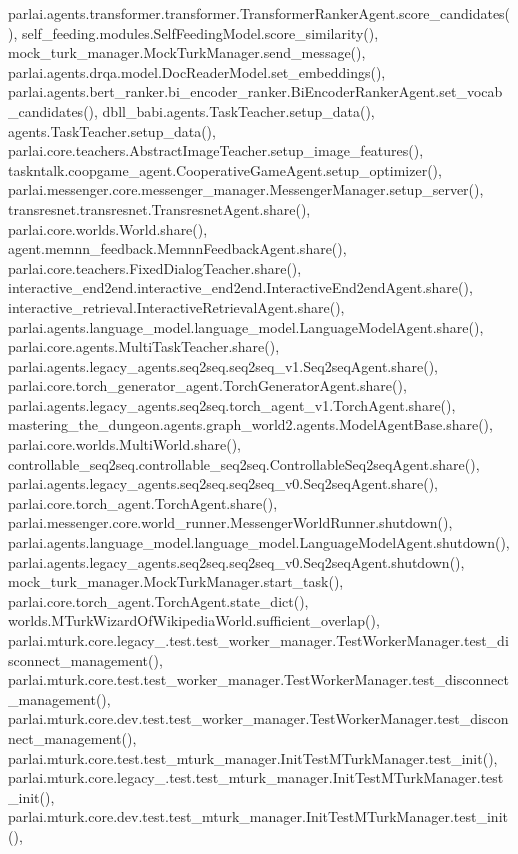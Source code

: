parlai.\+agents.\+transformer.\+transformer.\+Transformer\+Ranker\+Agent.\+score\+\_\+candidates(), self\+\_\+feeding.\+modules.\+Self\+Feeding\+Model.\+score\+\_\+similarity(), mock\+\_\+turk\+\_\+manager.\+Mock\+Turk\+Manager.\+send\+\_\+message(), parlai.\+agents.\+drqa.\+model.\+Doc\+Reader\+Model.\+set\+\_\+embeddings(), parlai.\+agents.\+bert\+\_\+ranker.\+bi\+\_\+encoder\+\_\+ranker.\+Bi\+Encoder\+Ranker\+Agent.\+set\+\_\+vocab\+\_\+candidates(), dbll\+\_\+babi.\+agents.\+Task\+Teacher.\+setup\+\_\+data(), agents.\+Task\+Teacher.\+setup\+\_\+data(), parlai.\+core.\+teachers.\+Abstract\+Image\+Teacher.\+setup\+\_\+image\+\_\+features(), taskntalk.\+coopgame\+\_\+agent.\+Cooperative\+Game\+Agent.\+setup\+\_\+optimizer(), parlai.\+messenger.\+core.\+messenger\+\_\+manager.\+Messenger\+Manager.\+setup\+\_\+server(), transresnet.\+transresnet.\+Transresnet\+Agent.\+share(), parlai.\+core.\+worlds.\+World.\+share(), agent.\+memnn\+\_\+feedback.\+Memnn\+Feedback\+Agent.\+share(), parlai.\+core.\+teachers.\+Fixed\+Dialog\+Teacher.\+share(), interactive\+\_\+end2end.\+interactive\+\_\+end2end.\+Interactive\+End2end\+Agent.\+share(), interactive\+\_\+retrieval.\+Interactive\+Retrieval\+Agent.\+share(), parlai.\+agents.\+language\+\_\+model.\+language\+\_\+model.\+Language\+Model\+Agent.\+share(), parlai.\+core.\+agents.\+Multi\+Task\+Teacher.\+share(), parlai.\+agents.\+legacy\+\_\+agents.\+seq2seq.\+seq2seq\+\_\+v1.\+Seq2seq\+Agent.\+share(), parlai.\+core.\+torch\+\_\+generator\+\_\+agent.\+Torch\+Generator\+Agent.\+share(), parlai.\+agents.\+legacy\+\_\+agents.\+seq2seq.\+torch\+\_\+agent\+\_\+v1.\+Torch\+Agent.\+share(), mastering\+\_\+the\+\_\+dungeon.\+agents.\+graph\+\_\+world2.\+agents.\+Model\+Agent\+Base.\+share(), parlai.\+core.\+worlds.\+Multi\+World.\+share(), controllable\+\_\+seq2seq.\+controllable\+\_\+seq2seq.\+Controllable\+Seq2seq\+Agent.\+share(), parlai.\+agents.\+legacy\+\_\+agents.\+seq2seq.\+seq2seq\+\_\+v0.\+Seq2seq\+Agent.\+share(), parlai.\+core.\+torch\+\_\+agent.\+Torch\+Agent.\+share(), parlai.\+messenger.\+core.\+world\+\_\+runner.\+Messenger\+World\+Runner.\+shutdown(), parlai.\+agents.\+language\+\_\+model.\+language\+\_\+model.\+Language\+Model\+Agent.\+shutdown(), parlai.\+agents.\+legacy\+\_\+agents.\+seq2seq.\+seq2seq\+\_\+v0.\+Seq2seq\+Agent.\+shutdown(), mock\+\_\+turk\+\_\+manager.\+Mock\+Turk\+Manager.\+start\+\_\+task(), parlai.\+core.\+torch\+\_\+agent.\+Torch\+Agent.\+state\+\_\+dict(), worlds.\+M\+Turk\+Wizard\+Of\+Wikipedia\+World.\+sufficient\+\_\+overlap(), parlai.\+mturk.\+core.\+legacy\+\_.\+test.\+test\+\_\+worker\+\_\+manager.\+Test\+Worker\+Manager.\+test\+\_\+disconnect\+\_\+management(), parlai.\+mturk.\+core.\+test.\+test\+\_\+worker\+\_\+manager.\+Test\+Worker\+Manager.\+test\+\_\+disconnect\+\_\+management(), parlai.\+mturk.\+core.\+dev.\+test.\+test\+\_\+worker\+\_\+manager.\+Test\+Worker\+Manager.\+test\+\_\+disconnect\+\_\+management(), parlai.\+mturk.\+core.\+test.\+test\+\_\+mturk\+\_\+manager.\+Init\+Test\+M\+Turk\+Manager.\+test\+\_\+init(), parlai.\+mturk.\+core.\+legacy\+\_.\+test.\+test\+\_\+mturk\+\_\+manager.\+Init\+Test\+M\+Turk\+Manager.\+test\+\_\+init(), parlai.\+mturk.\+core.\+dev.\+test.\+test\+\_\+mturk\+\_\+manager.\+Init\+Test\+M\+Turk\+Manager.\+test\+\_\+init(), 